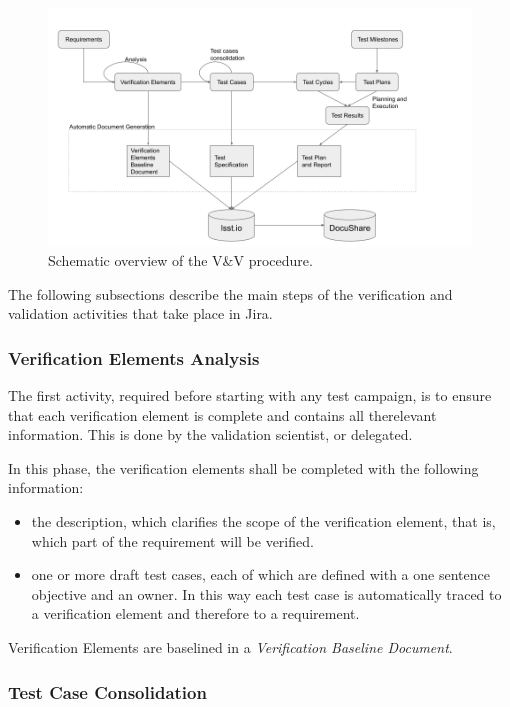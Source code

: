 \begin{figure}
\begin{center}
\includegraphics[width=\textwidth]{imgs/VandVprocedure.png}
 \caption{Schematic overview of the V\&V procedure.}
 \label{fig:vandvtools}
\end{center}
\end{figure}

The following subsections describe the main steps of the verification and validation activities that take place in Jira.


\subsubsection{Verification Elements Analysis}

The first activity, required before starting with any test campaign, is to ensure that each verification element is complete
and contains all therelevant information.
This is done by the validation scientist, or delegated.

In this phase, the verification elements shall be completed with the following information:
\begin{itemize}
\item the description, which clarifies the scope of the verification element, that is, which part of the requirement will be verified.
\item one or more draft test cases, each of which are defined with a one sentence objective and an owner. 
In this way each test case is automatically traced to a verification element and therefore to a requirement.
\end{itemize}
Verification Elements are baselined in a \textit{Verification Baseline Document}.


\subsubsection{Test Case Consolidation}

